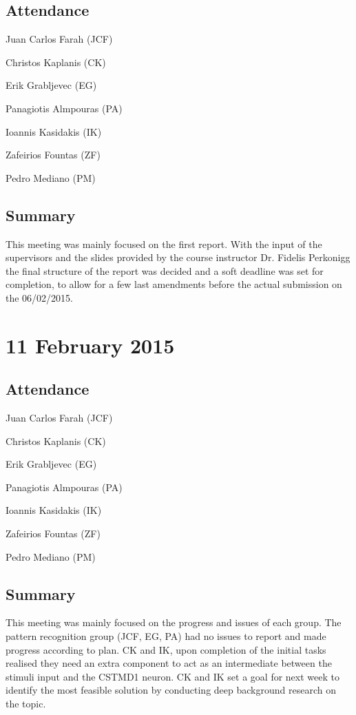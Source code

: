 \documentclass[a4paper,11pt]{article}
\begin{document}
\subsection*{Attendance}
\begin{compactenum}
\item Juan Carlos Farah (JCF)
\item Christos Kaplanis (CK)
\item Erik Grabljevec (EG)
\item Panagiotis Almpouras (PA)
\item Ioannis Kasidakis (IK)
\item Zafeirios Fountas (ZF)
\item Pedro Mediano (PM)
\end{compactenum}

\subsection*{Summary}
This meeting was mainly focused on the first report. With the input of the supervisors and the slides provided by the course instructor Dr. Fidelis Perkonigg the final structure of the report was decided and a soft deadline was set for completion, to allow for a few last amendments before the actual submission on the 06/02/2015.

\maketitle
\section*{11 February 2015}
\subsection*{Attendance}
\begin{compactenum}
\item Juan Carlos Farah (JCF)
\item Christos Kaplanis (CK)
\item Erik Grabljevec (EG)
\item Panagiotis Almpouras (PA)
\item Ioannis Kasidakis (IK)
\item Zafeirios Fountas (ZF)
\item Pedro Mediano (PM)
\end{compactenum}

\subsection*{Summary}
This meeting was mainly focused on the progress and issues of each group. The pattern recognition group (JCF, EG, PA) had no issues to report and made progress according to plan. CK and IK, upon completion of the initial tasks realised they need an extra component to act as an intermediate between the stimuli input and the CSTMD1 neuron. CK and IK set a goal for next week to identify the most feasible solution by conducting deep background research on the topic.
\end{document}
